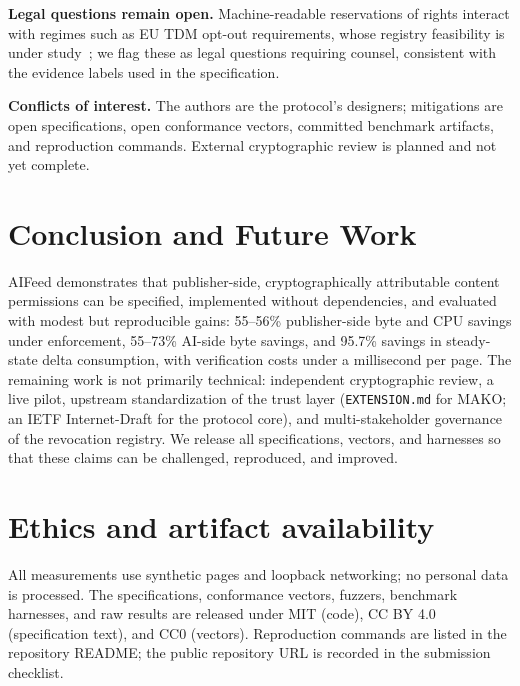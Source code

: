 \documentclass[11pt]{article}
\newcommand{\aifeed}{AIFeed}
\newcommand{\mako}{MAKO}
\newcommand{\code}[1]{\texttt{#1}}
\begin{document}
\textbf{Legal questions remain open.} Machine-readable reservations of rights interact
with regimes such as EU TDM opt-out requirements, whose registry feasibility is under
study~\citep{euTdmRegistry}; we flag these as legal questions requiring counsel,
consistent with the evidence labels used in the specification.

\textbf{Conflicts of interest.} The authors are the protocol's designers; mitigations are
open specifications, open conformance vectors, committed benchmark artifacts, and
reproduction commands. External cryptographic review is planned and not yet complete.

\section{Conclusion and Future Work}

\aifeed{} demonstrates that publisher-side, cryptographically attributable content
permissions can be specified, implemented without dependencies, and evaluated with
modest but reproducible gains: 55--56\% publisher-side byte and CPU savings under
enforcement, 55--73\% AI-side byte savings, and 95.7\% savings in steady-state delta
consumption, with verification costs under a millisecond per page. The remaining work is
not primarily technical: independent cryptographic review, a live pilot, upstream
standardization of the trust layer (\code{EXTENSION.md} for \mako{}; an IETF
Internet-Draft for the protocol core), and multi-stakeholder governance of the
revocation registry. We release all specifications, vectors, and harnesses so that these
claims can be challenged, reproduced, and improved.

\section*{Ethics and artifact availability}

All measurements use synthetic pages and loopback networking; no personal data is
processed. The specifications, conformance vectors, fuzzers, benchmark harnesses, and
raw results are released under MIT (code), CC BY 4.0 (specification text), and CC0
(vectors). Reproduction commands are listed in the repository README; the public
repository URL is recorded in the submission checklist.



\end{document}
